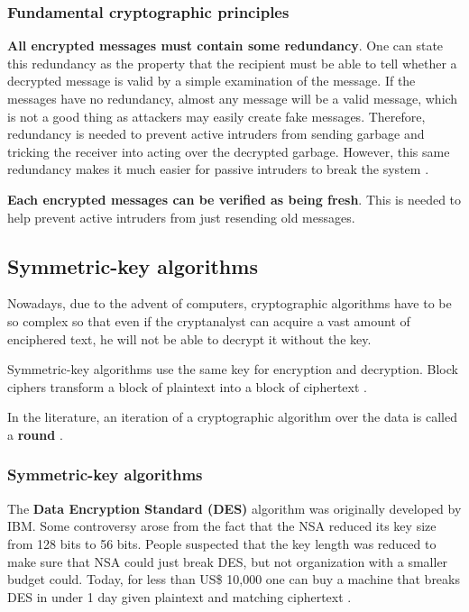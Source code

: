 \documentclass[12pt, oneside]{book}
\begin{document}
\subsubsection{Fundamental cryptographic principles}

\textbf{All encrypted messages must contain some redundancy}.
One can state this redundancy as the property that the recipient must be able to tell whether a decrypted message is valid by a simple examination of the message.
If the messages have no redundancy, almost any message will be a valid message, which is not a good thing as attackers may easily create fake messages.
Therefore, redundancy is needed to prevent active intruders from sending garbage and tricking the receiver into acting over the decrypted garbage.
However, this same redundancy makes it much easier for passive intruders to break the system \cite[p.~778]{computer-networks-tanenbaum-2012}.

\textbf{Each encrypted messages can be verified as being fresh}. This is needed to help prevent active intruders from just resending old messages.

\subsection{Symmetric-key algorithms}

Nowadays, due to the advent of computers, cryptographic algorithms have to be so complex so that even if the cryptanalyst can acquire a vast amount of enciphered text, he will not be able to decrypt it without the key.

Symmetric-key algorithms use the same key for encryption and decryption. Block ciphers transform a block of plaintext into a block of ciphertext \cite[p.~779]{computer-networks-tanenbaum-2012}.

In the literature, an iteration of a cryptographic algorithm over the data is called a \textbf{round} \cite[p.~780]{computer-networks-tanenbaum-2012}.

\subsubsection{Symmetric-key algorithms}

The \textbf{Data Encryption Standard (DES)} algorithm was originally developed by IBM.
Some controversy arose from the fact that the NSA reduced its key size from 128 bits to 56 bits.
People suspected that the key length was reduced to make sure that NSA could just break DES, but not organization with a smaller budget could.
Today, for less than US\$ 10,000 one can buy a machine that breaks DES in under 1 day given plaintext and matching ciphertext \cite[p.~782]{computer-networks-tanenbaum-2012}.
\end{document}
